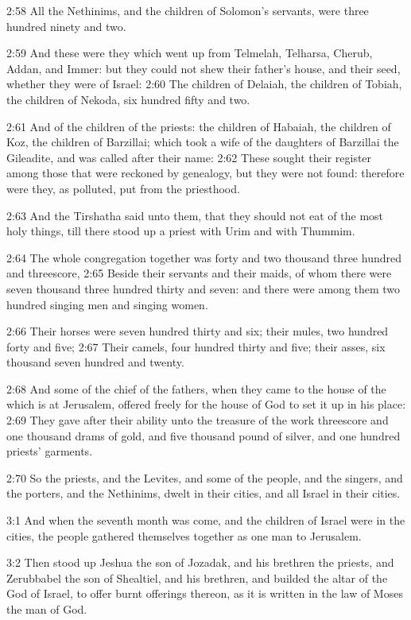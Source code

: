 2:58 All the Nethinims, and the children of Solomon's servants, were three hundred ninety and two.

2:59 And these were they which went up from Telmelah, Telharsa, Cherub, Addan, and Immer: but they could not shew their father's house, and their seed, whether they were of Israel: 2:60 The children of Delaiah, the children of Tobiah, the children of Nekoda, six hundred fifty and two.

2:61 And of the children of the priests: the children of Habaiah, the children of Koz, the children of Barzillai; which took a wife of the daughters of Barzillai the Gileadite, and was called after their name: 2:62 These sought their register among those that were reckoned by genealogy, but they were not found: therefore were they, as polluted, put from the priesthood.

2:63 And the Tirshatha said unto them, that they should not eat of the most holy things, till there stood up a priest with Urim and with Thummim.

2:64 The whole congregation together was forty and two thousand three hundred and threescore, 2:65 Beside their servants and their maids, of whom there were seven thousand three hundred thirty and seven: and there were among them two hundred singing men and singing women.

2:66 Their horses were seven hundred thirty and six; their mules, two hundred forty and five; 2:67 Their camels, four hundred thirty and five; their asses, six thousand seven hundred and twenty.

2:68 And some of the chief of the fathers, when they came to the house of the \LORD which is at Jerusalem, offered freely for the house of God to set it up in his place: 2:69 They gave after their ability unto the treasure of the work threescore and one thousand drams of gold, and five thousand pound of silver, and one hundred priests' garments.

2:70 So the priests, and the Levites, and some of the people, and the singers, and the porters, and the Nethinims, dwelt in their cities, and all Israel in their cities.

3:1 And when the seventh month was come, and the children of Israel were in the cities, the people gathered themselves together as one man to Jerusalem.

3:2 Then stood up Jeshua the son of Jozadak, and his brethren the priests, and Zerubbabel the son of Shealtiel, and his brethren, and builded the altar of the God of Israel, to offer burnt offerings thereon, as it is written in the law of Moses the man of God.


